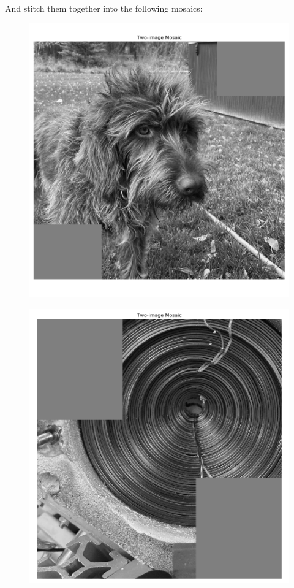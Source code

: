 \documentclass[]{article}
\begin{document}
And stitch them together into the following mosaics:

\begin{figure}[H]
	\centering
	\includegraphics[width=6.5in]{p3_output/img_0_mosaic.png}
\end{figure}

\begin{figure}[H]
	\centering
	\includegraphics[width=6.5in]{p3_output/img_1_mosaic.png}
\end{figure}
\end{document}
